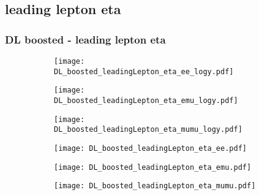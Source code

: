 \documentclass[aspectratio=169,8pt]{beamer}
\begin{document}
\subsection{leading lepton eta}
\begin{frame}
\frametitle{DL boosted - leading lepton eta}
\begin{figure}
\captionsetup[subfigure]{labelformat=empty}
\begin{subfigure}{0.32\textwidth}
\texttt{[image: DL\_boosted\_leadingLepton\_eta\_ee\_logy.pdf]}
\vspace*{-0.15cm}
\end{subfigure}
\hfil
\begin{subfigure}{0.32\textwidth}
\texttt{[image: DL\_boosted\_leadingLepton\_eta\_emu\_logy.pdf]}
\vspace*{-0.15cm}
\end{subfigure}
\hfil
\begin{subfigure}{0.32\textwidth}
\texttt{[image: DL\_boosted\_leadingLepton\_eta\_mumu\_logy.pdf]}
\vspace*{-0.15cm}
\end{subfigure}
\hfil
\begin{subfigure}{0.32\textwidth}
\texttt{[image: DL\_boosted\_leadingLepton\_eta\_ee.pdf]}
\vspace*{-0.15cm}
\end{subfigure}
\hfil
\begin{subfigure}{0.32\textwidth}
\texttt{[image: DL\_boosted\_leadingLepton\_eta\_emu.pdf]}
\vspace*{-0.15cm}
\end{subfigure}
\hfil
\begin{subfigure}{0.32\textwidth}
\texttt{[image: DL\_boosted\_leadingLepton\_eta\_mumu.pdf]}
\vspace*{-0.15cm}
\end{subfigure}
\hfil
\end{figure}
\end{frame}
\newpage
\end{document}
